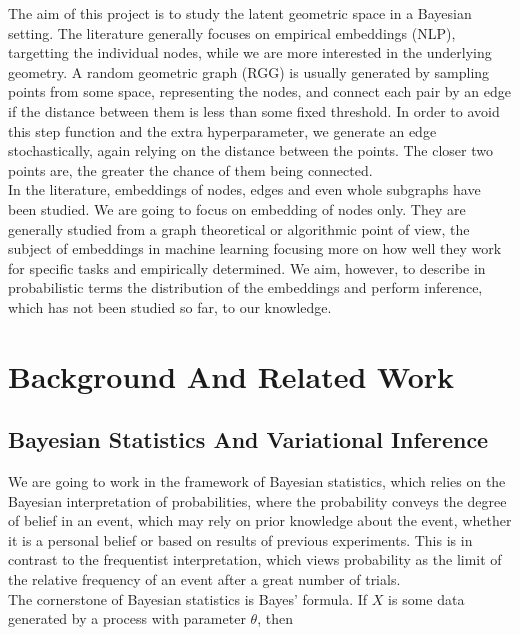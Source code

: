 \documentclass[12pt]{report}
\begin{document}
The aim of this project is to study the latent geometric space in a Bayesian setting. The literature generally focuses on empirical embeddings (NLP), targetting the individual nodes, while we are more interested in the underlying geometry. A random geometric graph (RGG) is usually generated by sampling points from some space, representing the nodes, and connect each pair by an edge if the distance between them is less than some fixed threshold. In order to avoid this step function and the extra hyperparameter, we generate an edge stochastically, again relying on the distance between the points. The closer two points are, the greater the chance of them being connected. \\

In the literature, embeddings of nodes, edges and even whole subgraphs have been studied. We are going to focus on embedding of nodes only. They are generally studied from a graph theoretical or algorithmic point of view, the subject of embeddings in machine learning focusing more on how well they work for specific tasks and empirically determined. We aim, however, to describe in probabilistic terms the distribution of the embeddings and perform inference, which has not been studied so far, to our knowledge.

\chapter{Background And Related Work}

\section{Bayesian Statistics And Variational Inference}

We are going to work in the framework of Bayesian statistics, which relies on the Bayesian interpretation of probabilities, where the probability conveys the degree of belief in an event, which may rely on prior knowledge about the event, whether it is a personal belief or based on results of previous experiments. This is in contrast to the frequentist interpretation, which views probability as the limit of the relative frequency of an event after a great number of trials. \\

The cornerstone of Bayesian statistics is Bayes' formula. If $X$ is some data generated by a process with parameter $\theta$, then
\end{document}
